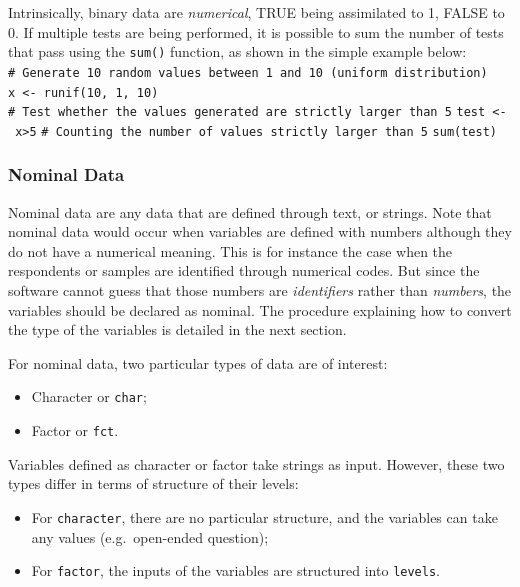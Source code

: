 \documentclass[
]{krantz}
\providecommand{\tightlist}{%
  \setlength{\itemsep}{0pt}\setlength{\parskip}{0pt}}
\renewenvironment{quote}{\begin{VF}}{\end{VF}}
\begin{document}
\begin{quote}
Intrinsically, binary data are \emph{numerical}, TRUE being assimilated to 1, FALSE to 0. If multiple tests are being performed, it is possible to sum the number of tests that pass using the \texttt{sum()} function, as shown in the simple example below:
\texttt{\#\ Generate\ 10\ random\ values\ between\ 1\ and\ 10\ (uniform\ distribution)}
\texttt{x\ \textless{}-\ runif(10,\ 1,\ 10)}
\texttt{\#\ Test\ whether\ the\ values\ generated\ are\ strictly\ larger\ than\ 5}
\texttt{test\ \textless{}-\ x\textgreater{}5}
\texttt{\#\ Counting\ the\ number\ of\ values\ strictly\ larger\ than\ 5}
\texttt{sum(test)}
\end{quote}

\hypertarget{nominal-data}{%
\subsubsection*{Nominal Data}\label{nominal-data}}


Nominal data are any data that are defined through text, or strings. Note that nominal data would occur when variables are defined with numbers although they do not have a numerical meaning. This is for instance the case when the respondents or samples are identified through numerical codes. But since the software cannot guess that those numbers are \emph{identifiers} rather than \emph{numbers}, the variables should be declared as nominal. The procedure explaining how to convert the type of the variables is detailed in the next section.

For nominal data, two particular types of data are of interest:

\begin{itemize}
\tightlist
\item
  Character or \texttt{char};
\item
  Factor or \texttt{fct}.
\end{itemize}

Variables defined as character or factor take strings as input. However, these two types differ in terms of structure of their levels:

\begin{itemize}
\tightlist
\item
  For \texttt{character}, there are no particular structure, and the variables can take any values (e.g.~open-ended question);
\item
  For \texttt{factor}, the inputs of the variables are structured into \texttt{levels}.
\end{itemize}
\end{document}
